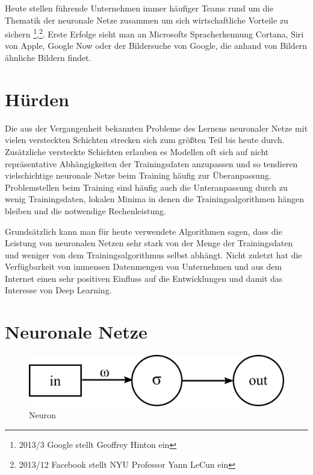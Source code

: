 Heute stellen führende Unternehmen immer häufiger Teams rund um die Thematik der neuronale Netze zusammen um sich wirtschaftliche Vorteile zu sichern \footnote{2013/3 Google stellt Geoffrey Hinton ein},\footnote{2013/12 Facebook stellt NYU Professor Yann LeCun ein}. Erste Erfolge sieht man an Microsofts Spracherkennung Cortana, Siri von Apple, Google Now oder der Bildersuche von Google, die anhand von Bildern ähnliche Bildern findet.


\section{Hürden}

Die aus der Vergangenheit bekannten Probleme des Lernens neuronaler Netze mit vielen versteckten Schichten strecken sich zum größten Teil bis heute durch. Zusätzliche versteckte Schichten erlauben es Modellen oft sich auf nicht repräsentative Abhängigkeiten der Trainingsdaten anzupassen und so tendieren vielschichtige neuronale Netze beim Training häufig zur Überanpassung. Problemstellen beim Training sind häufig auch die Unteranpassung durch zu wenig Trainingsdaten, lokalen Minima in denen die Trainingsalgorithmen hängen bleiben und die notwendige Rechenleistung.

Grundsätzlich kann man für heute verwendete Algorithmen sagen, dass die Leistung von neuronalen Netzen sehr stark von der Menge der Trainingsdaten und weniger von dem Trainingsalgorithmus selbst abhängt. Nicht zuletzt hat die Verfügbarkeit von immensen Datenmengen von Unternehmen und aus dem Internet einen sehr positiven Einfluss auf die Entwicklungen und damit das Interesse von Deep Learning.


\section{Neuronale Netze}

\begin{figure}
	\centering
	\includegraphics[scale=1]{images/neuron.png}
	\caption{Neuron}
	\label{fig:neuron}
\end{figure}

